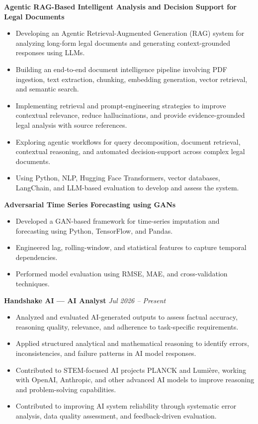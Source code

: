 \documentclass[10pt]{article}
\begin{document}
\textbf{Agentic RAG-Based Intelligent Analysis and Decision Support for Legal Documents}

\begin{itemize}[noitemsep,topsep=0pt]
\item Developing an Agentic Retrieval-Augmented Generation (RAG) system for analyzing long-form legal documents and generating context-grounded responses using LLMs.
\item Building an end-to-end document intelligence pipeline involving PDF ingestion, text extraction, chunking, embedding generation, vector retrieval, and semantic search.
\item Implementing retrieval and prompt-engineering strategies to improve contextual relevance, reduce hallucinations, and provide evidence-grounded legal analysis with source references.
\item Exploring agentic workflows for query decomposition, document retrieval, contextual reasoning, and automated decision-support across complex legal documents.
\item Using Python, NLP, Hugging Face Transformers, vector databases, LangChain, and LLM-based evaluation to develop and assess the system.
\end{itemize}
\textbf{Adversarial Time Series Forecasting using GANs}

\begin{itemize}[noitemsep,topsep=0pt]
\item Developed a GAN-based framework for time-series imputation and forecasting using Python, TensorFlow, and Pandas.
\item Engineered lag, rolling-window, and statistical features to capture temporal dependencies.
\item Performed model evaluation using RMSE, MAE, and cross-validation techniques.
\end{itemize}

\textbf{Handshake AI — AI Analyst} \hfill \textit{Jul 2026 -- Present}

\begin{itemize}[noitemsep,topsep=0pt]
\item Analyzed and evaluated AI-generated outputs to assess factual accuracy, reasoning quality, relevance, and adherence to task-specific requirements.
\item Applied structured analytical and mathematical reasoning to identify errors, inconsistencies, and failure patterns in AI model responses.
\item Contributed to STEM-focused AI projects PLANCK and Lumière, working with OpenAI, Anthropic, and other advanced AI models to improve reasoning and problem-solving capabilities.
\item Contributed to improving AI system reliability through systematic error analysis, data quality assessment, and feedback-driven evaluation.
\end{itemize}
\end{document}
